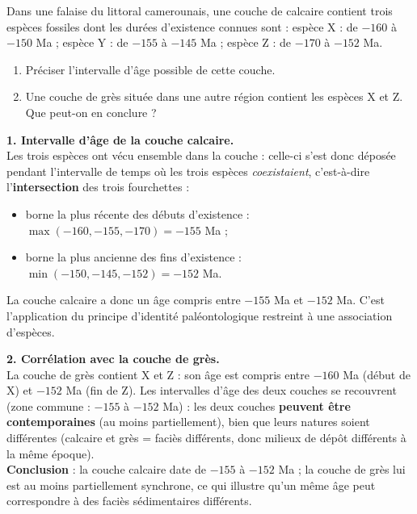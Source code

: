 \documentclass[11pt]{article}
\newcommand{\cle}[1]{{\popxbold\color{popdark}#1}}
\begin{document}
\begin{exoresolu}
Dans une falaise du littoral camerounais, une couche de calcaire contient trois espèces fossiles dont les durées d'existence connues sont : espèce X : de $-160$ à $-150$ Ma ; espèce Y : de $-155$ à $-145$ Ma ; espèce Z : de $-170$ à $-152$ Ma.
\begin{enumerate}
\item Préciser l'intervalle d'âge possible de cette couche.
\item Une couche de grès située dans une autre région contient les espèces X et Z. Que peut-on en conclure ?
\end{enumerate}
\tcblower
\textbf{1. Intervalle d'âge de la couche calcaire.}\\
Les trois espèces ont vécu ensemble dans la couche : celle-ci s'est donc déposée pendant l'intervalle de temps où les trois espèces \emph{coexistaient}, c'est-à-dire l'\textbf{intersection} des trois fourchettes :
\begin{itemize}
\item borne la plus récente des débuts d'existence : $\max(-160, -155, -170) = -155$ Ma ;
\item borne la plus ancienne des fins d'existence : $\min(-150, -145, -152) = -152$ Ma.
\end{itemize}
La couche calcaire a donc un âge compris entre $-155$ Ma et $-152$ Ma. C'est l'application du \cle{principe d'identité paléontologique} restreint à une association d'espèces.

\textbf{2. Corrélation avec la couche de grès.}\\
La couche de grès contient X et Z : son âge est compris entre $-160$ Ma (début de X) et $-152$ Ma (fin de Z). Les intervalles d'âge des deux couches se recouvrent (zone commune : $-155$ à $-152$ Ma) : les deux couches \textbf{peuvent être contemporaines} (au moins partiellement), bien que leurs natures soient différentes (calcaire et grès = faciès différents, donc milieux de dépôt différents à la même époque).\\
\textbf{Conclusion} : la couche calcaire date de $-155$ à $-152$ Ma ; la couche de grès lui est au moins partiellement synchrone, ce qui illustre qu'un même âge peut correspondre à des faciès sédimentaires différents.
\end{exoresolu}
\end{document}
